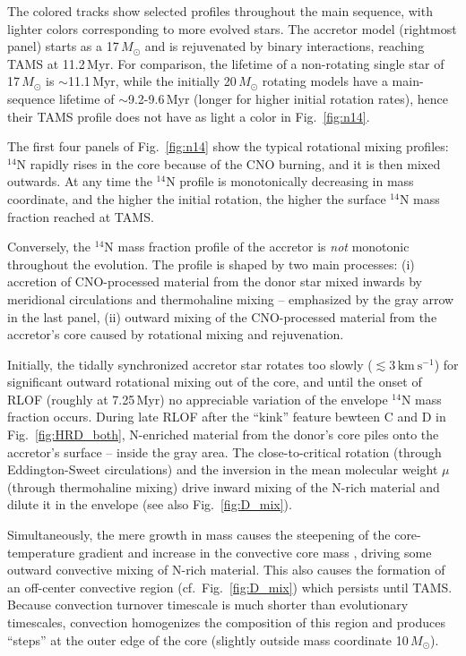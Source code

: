 \documentclass[twocolumn,twocolappendix,trackchanges]{aastex63}
\newcommand{\kms}{{\mathrm{km\ s^{-1}}}}
\DeclareRobustCommand{\Figref}[1]{Fig.~\ref{#1}}
\begin{document}
The colored tracks show selected profiles throughout the main
sequence, with lighter colors corresponding to more evolved stars. The
accretor model (rightmost panel) starts as a 17$\,M_\odot$ and is
rejuvenated by binary interactions, reaching TAMS at
11.2\,Myr. For comparison, the lifetime of a non-rotating single star
of 17\,$M_\odot$ is $\sim$11.1\,Myr, while the initially 20\,$M_\odot$
rotating models have a main-sequence lifetime of $\sim$9.2-9.6\,Myr (longer
for higher initial rotation rates), hence their TAMS profile does not
have as light a color in \Figref{fig:n14}.

The first four panels of \Figref{fig:n14} show the typical rotational
mixing profiles: $^{14}\mathrm{N}$ rapidly rises in the core because
of the CNO burning, and it is then mixed outwards. At any time
the $^{14}\mathrm{N}$ profile is monotonically decreasing in mass
coordinate, and the higher the initial rotation, the higher the
surface $^{14}\mathrm{N}$ mass fraction reached at TAMS.

Conversely, the $^{14}\mathrm{N}$ mass fraction profile of the
accretor is \emph{not} monotonic throughout the evolution.  The
profile is shaped by two main processes: (i) accretion of
CNO-processed material from the donor star mixed inwards by meridional
circulations and thermohaline mixing -- emphasized by the gray arrow
in the last panel, (ii) outward mixing of the
CNO-processed material from the accretor's core caused by rotational
mixing and rejuvenation.

Initially, the tidally synchronized accretor star
rotates too slowly ($\lesssim 3\,\kms$) for significant outward rotational mixing out of
the core, and until the onset of RLOF (roughly at 7.25\,Myr) no appreciable variation of the
envelope $^{14}\mathrm{N}$ mass fraction occurs. During late RLOF after the
``kink'' feature bewteen C and D in \Figref{fig:HRD_both}, N-enriched material from the
donor's core piles onto the accretor's surface -- inside the gray
area. The close-to-critical
rotation (through Eddington-Sweet circulations) and the inversion in the mean molecular
weight $\mu$ (through thermohaline mixing) drive inward mixing of
the N-rich material and dilute it in the envelope (see also \Figref{fig:D_mix}).

Simultaneously, the mere growth in mass causes the steepening of the
core-temperature gradient and increase in the convective core mass
\citep[rejuvenation, e.g.,][]{schneider:16}, driving some outward
convective mixing of N-rich material. This also causes the formation
of an off-center convective region (cf.~\Figref{fig:D_mix}) which
persists until TAMS. Because convection turnover timescale is much
shorter than evolutionary timescales, convection homogenizes the
composition of this region and produces ``steps'' at
the outer edge of the core (slightly outside mass coordinate
10\,$M_\odot$).
\end{document}
